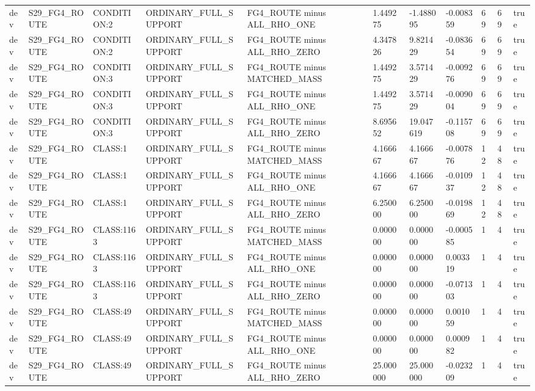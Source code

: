 \begin{tabular}{lllllllllll}
dev & S29\_FG4\_ROUTE & CONDITION:2 & ORDINARY\_FULL\_SUPPORT & FG4\_ROUTE minus ALL\_RHO\_ONE & 1.449275 & -1.488095 & -0.008359 & 69 & 69 & true \\
dev & S29\_FG4\_ROUTE & CONDITION:2 & ORDINARY\_FULL\_SUPPORT & FG4\_ROUTE minus ALL\_RHO\_ZERO & 4.347826 & 9.821429 & -0.083654 & 69 & 69 & true \\
dev & S29\_FG4\_ROUTE & CONDITION:3 & ORDINARY\_FULL\_SUPPORT & FG4\_ROUTE minus MATCHED\_MASS & 1.449275 & 3.571429 & -0.009276 & 69 & 69 & true \\
dev & S29\_FG4\_ROUTE & CONDITION:3 & ORDINARY\_FULL\_SUPPORT & FG4\_ROUTE minus ALL\_RHO\_ONE & 1.449275 & 3.571429 & -0.009004 & 69 & 69 & true \\
dev & S29\_FG4\_ROUTE & CONDITION:3 & ORDINARY\_FULL\_SUPPORT & FG4\_ROUTE minus ALL\_RHO\_ZERO & 8.695652 & 19.047619 & -0.115708 & 69 & 69 & true \\
dev & S29\_FG4\_ROUTE & CLASS:1 & ORDINARY\_FULL\_SUPPORT & FG4\_ROUTE minus MATCHED\_MASS & 4.166667 & 4.166667 & -0.007876 & 12 & 48 & true \\
dev & S29\_FG4\_ROUTE & CLASS:1 & ORDINARY\_FULL\_SUPPORT & FG4\_ROUTE minus ALL\_RHO\_ONE & 4.166667 & 4.166667 & -0.010937 & 12 & 48 & true \\
dev & S29\_FG4\_ROUTE & CLASS:1 & ORDINARY\_FULL\_SUPPORT & FG4\_ROUTE minus ALL\_RHO\_ZERO & 6.250000 & 6.250000 & -0.019869 & 12 & 48 & true \\
dev & S29\_FG4\_ROUTE & CLASS:1163 & ORDINARY\_FULL\_SUPPORT & FG4\_ROUTE minus MATCHED\_MASS & 0.000000 & 0.000000 & -0.000585 & 1 & 4 & true \\
dev & S29\_FG4\_ROUTE & CLASS:1163 & ORDINARY\_FULL\_SUPPORT & FG4\_ROUTE minus ALL\_RHO\_ONE & 0.000000 & 0.000000 & 0.003319 & 1 & 4 & true \\
dev & S29\_FG4\_ROUTE & CLASS:1163 & ORDINARY\_FULL\_SUPPORT & FG4\_ROUTE minus ALL\_RHO\_ZERO & 0.000000 & 0.000000 & -0.071303 & 1 & 4 & true \\
dev & S29\_FG4\_ROUTE & CLASS:49 & ORDINARY\_FULL\_SUPPORT & FG4\_ROUTE minus MATCHED\_MASS & 0.000000 & 0.000000 & 0.001059 & 1 & 4 & true \\
dev & S29\_FG4\_ROUTE & CLASS:49 & ORDINARY\_FULL\_SUPPORT & FG4\_ROUTE minus ALL\_RHO\_ONE & 0.000000 & 0.000000 & 0.000982 & 1 & 4 & true \\
dev & S29\_FG4\_ROUTE & CLASS:49 & ORDINARY\_FULL\_SUPPORT & FG4\_ROUTE minus ALL\_RHO\_ZERO & 25.000000 & 25.000000 & -0.023209 & 1 & 4 & true \\

\end{tabular}
